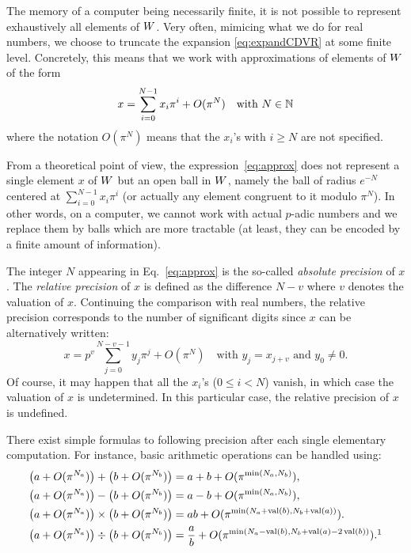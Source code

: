\documentclass{article}
\DeclareMathOperator{\val}{val}
\begin{document}
The memory of a computer being necessarily finite, it is not possible to 
represent exhaustively all elements of $W$. Very often, mimicing 
what we do for real numbers, we choose to truncate the expansion 
\eqref{eq:expandCDVR} at some finite level. Concretely, this means 
that we work with approximations of elements of $W$ of the form
\begin{equation}
\label{eq:approx}
x = \sum_{i=0}^{N-1} x_i \pi^i + O(\pi^N) \quad \text{with } N \in \mathbb N
\end{equation}
where the notation $O(\pi^N)$ means that the $x_i$'s with $i \geq N$ are 
not specified.

\begin{rem}
\label{rem:balls}
From a theoretical point of view, the expression~\eqref{eq:approx}
does not represent a single element $x$ of $W$ but an open ball in
$W$, namely the ball of radius $e^{-N}$ centered at $\sum_{i=0}^{N-1} 
x_i \pi^i$ (or actually any element congruent to it modulo $\pi^N$).
In other words, on a computer, we cannot work with actual $p$-adic
numbers and we replace them by balls which are more tractable (at
least, they can be encoded by a finite amount of information).
\end{rem}

The integer $N$ appearing in Eq.~\eqref{eq:approx} is the so-called 
\emph{absolute precision} of $x$. The \emph{relative precision} of $x$ 
is defined as the difference $N-v$ where $v$ denotes the valuation of 
$x$. Continuing the comparison with real numbers, the relative precision 
corresponds to the number of significant digits since $x$ can be 
alternatively written:
$$x = p^v \sum_{j=0}^{N-v-1} y_j \pi^j + O(\pi^N)
\quad \text{with } y_j = x_{j+v} \text{ and } y_0 \neq 0.$$
Of course, it may happen that all the $x_i$'s ($0 \leq i < N$) vanish,
in which case the valuation of $x$ is undetermined. In this particular
case, the relative precision of $x$ is undefined.

There exist simple formulas to following precision after each single
elementary computation. For instance, basic arithmetic operations can
be handled using:
\begin{align}
\big(a + O(\pi^{N_a})\big) + \big(b + O(\pi^{N_b})\big) 
& = a + b + O(\pi^{\min(N_a,N_b)}), 
\label{eq:precadd} \\
\big(a + O(\pi^{N_a})\big) - \big(b + O(\pi^{N_b})\big) 
& = a - b + O(\pi^{\min(N_a,N_b)}), 
\label{eq:precsub} \\
\big(a + O(\pi^{N_a})\big) \times \big(b + O(\pi^{N_b})\big) 
& = ab + O(\pi^{\min(N_a + \val(b), N_b + \val(a))}).
\label{eq:precmul} \\
\big(a + O(\pi^{N_a})\big) \div \big(b + O(\pi^{N_b})\big) 
& = \frac a b + O(\pi^{\min(N_a - \val(b), N_b + \val(a) - 2 \val(b))}).\footnotemark
\label{eq:precdiv} 
\end{align}
\end{document}
